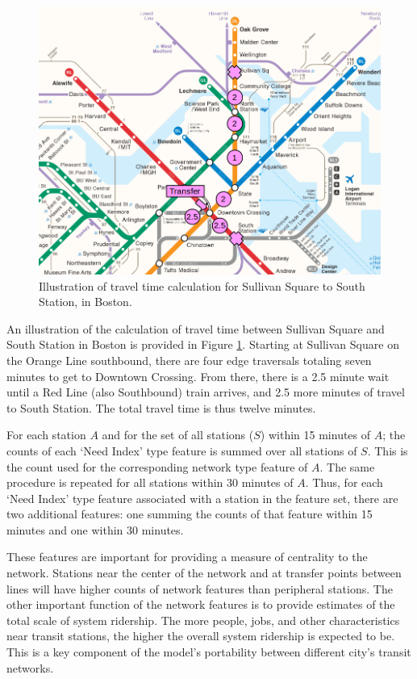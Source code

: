 \documentclass[11pt]{article}
\begin{document}
\begin{figure}
\begin{center}\includegraphics[scale=0.7]{transfer_demonstration}\end{center}\caption{Illustration of travel time calculation for Sullivan Square to South Station, in Boston.}\label{fig:f2}
\end{figure}

An illustration of the calculation of travel time between Sullivan Square and South Station in Boston is provided in Figure \ref{fig:f2}. Starting at Sullivan Square on the Orange Line southbound, there are four edge traversals totaling seven minutes to get to Downtown Crossing. From there, there is a 2.5 minute wait until a Red Line (also Southbound) train arrives, and 2.5 more minutes of travel to South Station. The total travel time is thus twelve minutes. 

For each station $A$ and for the set of all stations ($S$) within 15 minutes of $A$; the counts of each `Need Index' type feature is summed over all stations of $S$. This is the count used for the corresponding network type feature of $A$. The same procedure is repeated for all stations within 30 minutes of $A$. Thus, for each `Need Index' type feature associated with a station in the feature set, there are two additional features: one summing the counts of that feature within 15 minutes and one within 30 minutes. 

These features are important for providing a measure of centrality to the network. Stations near the center of the network and at transfer points between lines will have higher counts of network features than peripheral stations. The other important function of the network features is to provide estimates of the total scale of system ridership. The more people, jobs, and other characteristics near transit stations, the higher the overall system ridership is expected to be. This is a key component of the model's portability between different city's transit networks. 
\end{document}
